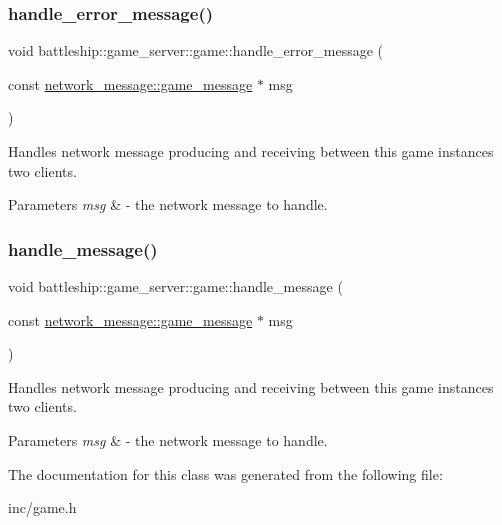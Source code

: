 \subsubsection{\texorpdfstring{handle\+\_\+error\+\_\+message()}{handle\_error\_message()}}
{\footnotesize\ttfamily void battleship\+::game\+\_\+server\+::game\+::handle\+\_\+error\+\_\+message (\begin{DoxyParamCaption}\item[{const \hyperlink{classbattleship_1_1network__message_1_1game__message}{network\+\_\+message\+::game\+\_\+message} $\ast$}]{msg }\end{DoxyParamCaption})\hspace{0.3cm}{\ttfamily [inline]}}

Handles network message producing and receiving between this game instance\textquotesingle{}s two clients.


\begin{DoxyParams}{Parameters}
{\em msg} & -\/ the network message to handle. \\
\hline
\end{DoxyParams}
\mbox{\label{classbattleship_1_1game__server_1_1game_ace7a4f5c9bbd5968869ff37763a3b7eb}} 
\subsubsection{\texorpdfstring{handle\+\_\+message()}{handle\_message()}}
{\footnotesize\ttfamily void battleship\+::game\+\_\+server\+::game\+::handle\+\_\+message (\begin{DoxyParamCaption}\item[{const \hyperlink{classbattleship_1_1network__message_1_1game__message}{network\+\_\+message\+::game\+\_\+message} $\ast$}]{msg }\end{DoxyParamCaption})\hspace{0.3cm}{\ttfamily [inline]}}

Handles network message producing and receiving between this game instance\textquotesingle{}s two clients.


\begin{DoxyParams}{Parameters}
{\em msg} & -\/ the network message to handle. \\
\hline
\end{DoxyParams}


The documentation for this class was generated from the following file\+:\begin{DoxyCompactItemize}
\item 
inc/game.\+h\end{DoxyCompactItemize}
